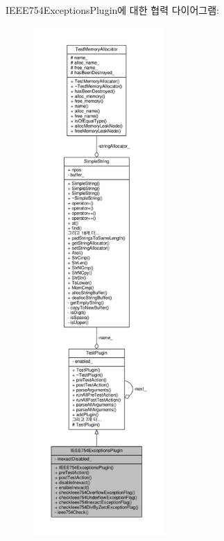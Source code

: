 I\+E\+E\+E754\+Exceptions\+Plugin에 대한 협력 다이어그램\+:
\nopagebreak
\begin{figure}[H]
\begin{center}
\leavevmode
\includegraphics[height=550pt]{class_i_e_e_e754_exceptions_plugin__coll__graph}
\end{center}
\end{figure}
